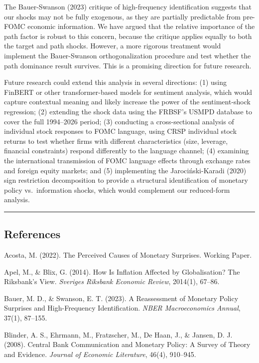 \documentclass[12pt]{article}
\begin{document}
The Bauer-Swanson (2023) critique of high-frequency identification
suggests that our shocks may not be fully exogenous, as they are
partially predictable from pre-FOMC economic information. We have argued
that the relative importance of the path factor is robust to this
concern, because the critique applies equally to both the target and
path shocks. However, a more rigorous treatment would implement the
Bauer-Swanson orthogonalization procedure and test whether the path
dominance result survives. This is a promising direction for future
research.

Future research could extend this analysis in several directions: (1)
using FinBERT or other transformer-based models for sentiment analysis,
which would capture contextual meaning and likely increase the power of
the sentiment-shock regression; (2) extending the shock data using the
FRBSF's USMPD database to cover the full 1994--2026 period; (3)
conducting a cross-sectional analysis of individual stock responses to
FOMC language, using CRSP individual stock returns to test whether firms
with different characteristics (size, leverage, financial constraints)
respond differently to the language channel; (4) examining the
international transmission of FOMC language effects through exchange
rates and foreign equity markets; and (5) implementing the
Jarociński-Karadi (2020) sign restriction decomposition to provide a
structural identification of monetary policy vs.~information shocks,
which would complement our reduced-form analysis.

\begin{center}\rule{0.5\linewidth}{0.5pt}\end{center}

\subsection{References}\label{references}

Acosta, M. (2022). The Perceived Causes of Monetary Surprises. Working
Paper.

Apel, M., \& Blix, G. (2014). How Is Inflation Affected by
Globalisation? The Riksbank's View. \emph{Sveriges Riksbank Economic
Review}, 2014(1), 67--86.

Bauer, M. D., \& Swanson, E. T. (2023). A Reassessment of Monetary
Policy Surprises and High-Frequency Identification. \emph{NBER
Macroeconomics Annual}, 37(1), 87--155.

Blinder, A. S., Ehrmann, M., Fratzscher, M., De Haan, J., \& Jansen, D.
J. (2008). Central Bank Communication and Monetary Policy: A Survey of
Theory and Evidence. \emph{Journal of Economic Literature}, 46(4),
910--945.
\end{document}
